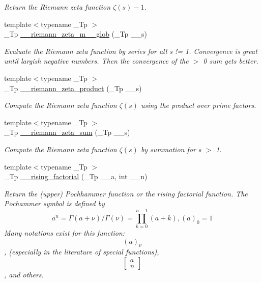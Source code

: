 \begin{DoxyCompactItemize}
\begin{DoxyCompactList}\small\item\em Return the Riemann zeta function $ \zeta(s) - 1 $. \end{DoxyCompactList}\item 
{\footnotesize template$<$typename \+\_\+\+Tp $>$ }\\\+\_\+\+Tp \hyperlink{namespacestd_1_1____detail_ac7a15aa2658fef76642cebd7858fa0ff}{\+\_\+\+\_\+riemann\+\_\+zeta\+\_\+m\+\_\+\_\+glob} (\+\_\+\+Tp \+\_\+\+\_\+s)
\begin{DoxyCompactList}\small\item\em Evaluate the Riemann zeta function by series for all s != 1. Convergence is great until largish negative numbers. Then the convergence of the $>$ 0 sum gets better. \end{DoxyCompactList}\item 
{\footnotesize template$<$typename \+\_\+\+Tp $>$ }\\\+\_\+\+Tp \hyperlink{namespacestd_1_1____detail_a917935f42a21af90b78a19ea81349129}{\+\_\+\+\_\+riemann\+\_\+zeta\+\_\+product} (\+\_\+\+Tp \+\_\+\+\_\+s)
\begin{DoxyCompactList}\small\item\em Compute the Riemann zeta function $ \zeta(s) $ using the product over prime factors. \end{DoxyCompactList}\item 
{\footnotesize template$<$typename \+\_\+\+Tp $>$ }\\\+\_\+\+Tp \hyperlink{namespacestd_1_1____detail_a417dc216465f02bb7ef055fa0e4e1f0b}{\+\_\+\+\_\+riemann\+\_\+zeta\+\_\+sum} (\+\_\+\+Tp \+\_\+\+\_\+s)
\begin{DoxyCompactList}\small\item\em Compute the Riemann zeta function $ \zeta(s) $ by summation for s $>$ 1. \end{DoxyCompactList}\item 
{\footnotesize template$<$typename \+\_\+\+Tp $>$ }\\\+\_\+\+Tp \hyperlink{namespacestd_1_1____detail_a5a4c41ee568639f8de4508051da9954a}{\+\_\+\+\_\+rising\+\_\+factorial} (\+\_\+\+Tp \+\_\+\+\_\+a, int \+\_\+\+\_\+n)
\begin{DoxyCompactList}\small\item\em Return the (upper) Pochhammer function or the rising factorial function. The Pochammer symbol is defined by \[ a^{\overline{n}} = \Gamma(a + \nu) / \Gamma(\nu) = \prod_{k=0}^{n-1} (a + k), (a)_0 = 1 \] Many notations exist for this function\+: \[ (a)_\nu \], (especially in the literature of special functions), \[ \left[ \begin{array}{c} a \\ n \end{array} \right] \], and others. \end{DoxyCompactList}\item 

\end{DoxyCompactItemize}
